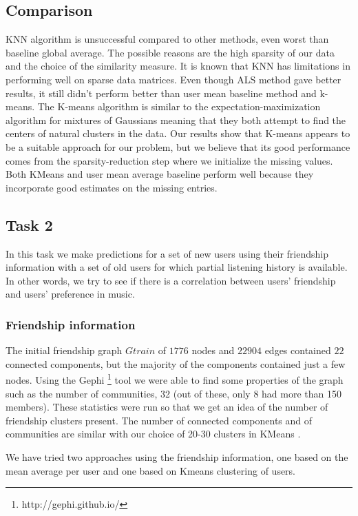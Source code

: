 \subsection{Comparison}

KNN algorithm is unsuccessful compared to other methods, even worst than baseline global average. The possible reasons are the high sparsity of our data and the choice of the similarity measure. It is known that KNN has limitations in performing well on sparse data matrices. Even though ALS method gave better results, it still didn't perform better than user mean baseline method and k-means. The K-means algorithm is similar to the expectation-maximization algorithm for mixtures of Gaussians meaning that they both attempt to find the centers of natural clusters in the data. Our results show that K-means appears to be a suitable approach for our problem, but we believe that its good performance comes from the sparsity-reduction step where we initialize the missing values. Both KMeans and user mean average baseline perform well because
they incorporate good estimates on the missing entries.

\subsection{Task 2}
In this task we make predictions for a set of new users using their friendship information with a set of old users for which partial listening history is available. In other words, we try to see if there is a correlation between
users' friendship and users' preference in music.

\subsubsection{Friendship information}
The initial friendship graph $Gtrain$ of $1776$ nodes and $22904$ edges contained $22$ connected components, but the majority of the components contained just a few nodes.
Using the Gephi  \footnote{http://gephi.github.io/} tool we were able to find some properties of the graph such as the number of communities, 32 (out of these, only 8  had more than 150 members).
These statistics were run so that we get an idea of the number of friendship clusters present. The number of connected components and of communities are similar with our choice of 20-30 clusters in KMeans .

We have tried two approaches using the friendship information, one based on the mean average per user and one based on Kmeans clustering of users.

